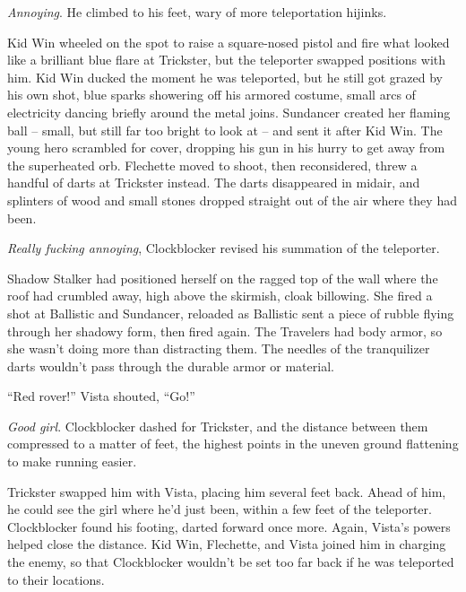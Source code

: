 \emph{Annoying}.  He climbed to his feet, wary of more teleportation hijinks.



Kid Win wheeled on the spot to raise a square-nosed pistol and fire what looked like a brilliant blue flare at Trickster, but the teleporter swapped positions with him.  Kid Win ducked the moment he was teleported, but he still got grazed by his own shot, blue sparks showering off his armored costume, small arcs of electricity dancing briefly around the metal joins.  Sundancer created her flaming ball – small, but still far too bright to look at – and sent it after Kid Win.  The young hero scrambled for cover, dropping his gun in his hurry to get away from the superheated orb.  Flechette moved to shoot, then reconsidered, threw a handful of darts at Trickster instead.  The darts disappeared in midair, and splinters of wood and small stones dropped straight out of the air where they had been.



\emph{Really fucking annoying}, Clockblocker revised his summation of the teleporter.



Shadow Stalker had positioned herself on the ragged top of the wall where the roof had crumbled away, high above the skirmish, cloak billowing.  She fired a shot at Ballistic and Sundancer, reloaded as Ballistic sent a piece of rubble flying through her shadowy form, then fired again.  The Travelers had body armor, so she wasn't doing more than distracting them.  The needles of the tranquilizer darts wouldn't pass through the durable armor or material.



``Red rover!'' Vista shouted, ``Go!''



\emph{Good girl}.  Clockblocker dashed for Trickster, and the distance between them compressed to a matter of feet, the highest points in the uneven ground flattening to make running easier.



Trickster swapped him with Vista, placing him several feet back.  Ahead of him, he could see the girl where he'd just been, within a few feet of the teleporter.  Clockblocker found his footing, darted forward once more.  Again, Vista's powers helped close the distance.  Kid Win, Flechette, and Vista joined him in charging the enemy, so that Clockblocker wouldn't be set too far back if he was teleported to their locations.



